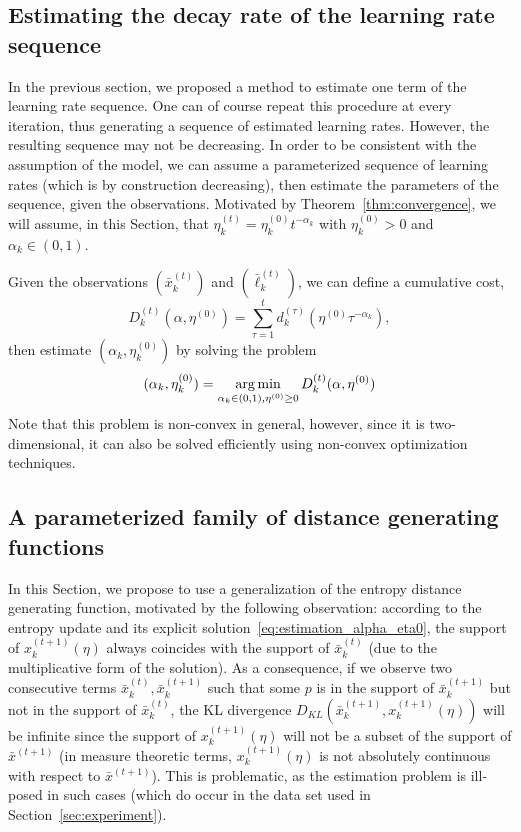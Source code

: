 \documentclass{sig-alternate-ipsn13}
\begin{document}
\subsection{Estimating the decay rate of the learning rate sequence}
In the previous section, we proposed a method to estimate one term of the learning rate sequence. One can of course repeat this procedure at every iteration, thus generating a sequence of estimated learning rates. However, the resulting sequence may not be decreasing. In order to be consistent with the assumption of the model, we can assume a parameterized sequence of learning rates (which is by construction decreasing), then estimate the parameters of the sequence, given the observations. Motivated by Theorem~\ref{thm:convergence}, we will assume, in this Section, that $\eta^{(t)}_k = \eta^{(0)}_k t^{-\alpha_k}$ with $\eta^{(0)}_k > 0$ and $\alpha_k \in (0, 1)$.

Given the observations $(\bar x^{(t)}_k)$ and $(\bar \ell^{(t)}_k)$, we can define a cumulative cost,
\[
D^{(t)}_k(\alpha, \eta^{(0)}) = \sum_{\tau = 1}^t d_k^{(\tau)}(\eta^{(0)} \tau^{-\alpha_k}),
\]
then estimate $(\alpha_k, \eta^{(0)}_k)$ by solving the problem
\begin{equation}
\label{eq:estimation_alpha_eta0}
(\alpha_k, \eta^{(0)}_k) = \operatorname*{arg\,min}_{\alpha_k \in (0, 1), \eta^{(0)} \geq 0} D^{(t)}_k(\alpha, \eta^{(0)})
\end{equation}
Note that this problem is non-convex in general, however, since it is two-dimensional, it can also be solved efficiently using non-convex optimization techniques.


\subsection{A parameterized family of distance generating functions}
In this Section, we propose to use a generalization of the entropy distance generating function, motivated by the following observation:
according to the entropy update and its explicit solution~\ref{eq:estimation_alpha_eta0}, the support of $x^{(t+1)}_k(\eta)$ always coincides with the support of $\bar x^{(t)}_k$ (due to the multiplicative form of the solution). As a consequence, if we observe two consecutive terms $\bar x^{(t)}_k, \bar x^{(t+1)}_k$ such that some $p$ is in the support of $\bar x^{(t+1)}_k$ but not in the support of $\bar x^{(t)}_k$, the KL divergence $D_{KL}(\bar x^{(t+1)}_k, x^{(t+1)}_k(\eta))$ will be infinite since the support of $x^{(t+1)}_k(\eta)$ will not be a subset of the support of $\bar x^{(t+1)}$ (in measure theoretic terms, $x^{(t+1)}_k(\eta)$ is not absolutely continuous with respect to $\bar x^{(t+1)}$). This is problematic, as the estimation problem is ill-posed in such cases (which do occur in the data set used in Section~\ref{sec:experiment}).
\end{document}
